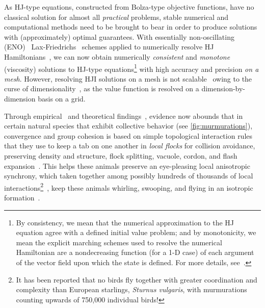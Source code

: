 As HJ-type equations, constructed from Bolza-type objective functions, have no classical solution for almost all \textit{practical} problems, stable numerical and computational methods need to be brought to bear in order to produce solutions with (approximately) optimal guarantees. With essentially non-oscillating (ENO)~\cite{OsherShuENO} Lax-Friedrichs~\cite{CrandallLaxFriedrichs} schemes applied to numerically resolve HJ Hamiltonians~\cite{Evans1984}, we can now obtain  numerically \textit{consistent} and \textit{monotone} (viscosity) solutions to HJ-type equations\footnote{By consistency, we mean that the numerical approximation to the HJ equation agree with a defined initial value problem; and by monotonicity, we mean the explicit marching schemes used to resolve the numerical Hamiltonian are a nondecreasing function (for a 1-D case) of each argument of the vector field upon which the state is defined. For more details, see~\cite{Crandall1984Approx, OsherShuENO}.} with high accuracy and precision \textit{on a mesh}. However, resolving HJI solutions on a mesh is not scalable~\cite{SylviaScalability, Bansal2018, Bajcsy} owing to the curse of dimensionality~\cite{Bellman1957}, as the value function is resolved on a dimension-by-dimension basis on a grid. 


%
Through empirical~\cite{Ballerini1232} %
and theoretical findings~\cite{JadbabaieCoord}, evidence now abounds that in certain natural species that exhibit collective behavior (see \autoref{fig:murmurations}), convergence and group cohesion is based on simple topological interaction rules that they use to keep a tab on one another in \textit{local flocks} for collision avoidance, preserving density and structure, flock splitting, vacuole, cordon, and flash expansion~\cite{NatGeo}. This helps these animals preserve an eye-pleasing local anisotropic synchrony, which taken together among possibly hundreds of thousands of local interactions\footnote{It has been reported that no birds fly together with greater coordination and complexity than European starlings, \textit{Sturnus vulgaris}, with murmurations counting upwards of 750,000 individual birds!}~\cite{NatGeo}, keep these animals whirling, swooping, and flying in an isotropic formation~\cite{Ballerini1232}. 

